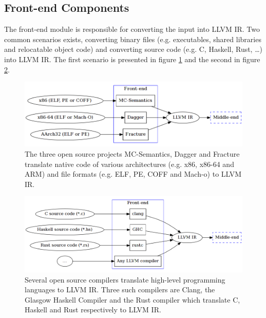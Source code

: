 
\subsection{Front-end Components}


The front-end module is responsible for converting the input into LLVM IR. Two common scenarios exists, converting binary files (e.g. executables, shared libraries and relocatable object code) and converting source code (e.g. C, Haskell, Rust, …) into LLVM IR. The first scenario is presented in figure \ref{fig:front-end_binary} and the second in figure \ref{fig:front-end_source}.


\begin{figure}[htbp]
	\begin{center}
		\includegraphics[width=\textwidth]{inc/front-end_binary.png}
		\caption{The three open source projects MC-Semantics, Dagger and Fracture translate native code of various architectures (e.g. x86, x86-64 and ARM) and file formats (e.g. ELF, PE, COFF and Mach-o) to LLVM IR.}
		\label{fig:front-end_binary}
	\end{center}
\end{figure}

\begin{figure}[htbp]
	\begin{center}
		\includegraphics[width=\textwidth]{inc/front-end_source.png}
		\caption{Several open source compilers translate high-level programming languages to LLVM IR. Three such compilers are Clang, the Glasgow Haskell Compiler and the Rust compiler which translate C, Haskell and Rust respectively to LLVM IR.}
		\label{fig:front-end_source}
	\end{center}
\end{figure}
